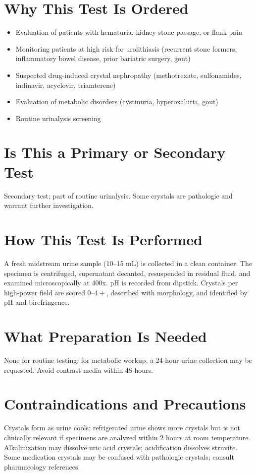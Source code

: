 \section*{Why This Test Is Ordered}
\begin{itemize}
  \item Evaluation of patients with hematuria, kidney stone passage, or flank pain
  \item Monitoring patients at high risk for urolithiasis (recurrent stone formers, inflammatory bowel disease, prior bariatric surgery, gout)
  \item Suspected drug-induced crystal nephropathy (methotrexate, sulfonamides, indinavir, acyclovir, triamterene)
  \item Evaluation of metabolic disorders (cystinuria, hyperoxaluria, gout)
  \item Routine urinalysis screening
\end{itemize}

\section*{Is This a Primary or Secondary Test}
Secondary test; part of routine urinalysis. Some crystals are pathologic and warrant further investigation.

\section*{How This Test Is Performed}
A fresh midstream urine sample (10--15 mL) is collected in a clean container. The specimen is centrifuged, supernatant decanted, resuspended in residual fluid, and examined microscopically at 400x. pH is recorded from dipstick. Crystals per high-power field are scored $0$--$4+$, described with morphology, and identified by pH and birefringence.

\section*{What Preparation Is Needed}
None for routine testing; for metabolic workup, a 24-hour urine collection may be requested. Avoid contrast media within 48 hours.

\section*{Contraindications and Precautions}
Crystals form as urine cools; refrigerated urine shows more crystals but is not clinically relevant if specimens are analyzed within 2 hours at room temperature. Alkalinization may dissolve uric acid crystals; acidification dissolves struvite. Some medication crystals may be confused with pathologic crystals; consult pharmacology references.

